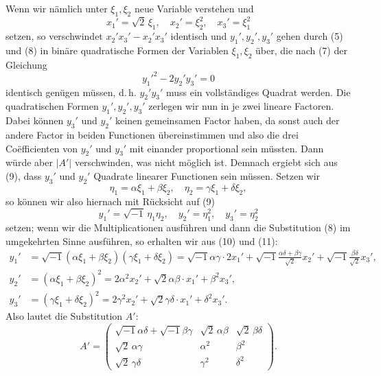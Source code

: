 \documentclass[12pt,a4paper]{article}
\theoremstyle{plain}
\theoremstyle{definition}
\theoremstyle{remark}
\begin{document}
Wenn wir n\"amlich unter $\xi_1, \xi_2$ neue Variable verstehen und
\begin{equation}\label{eq:49_8}
x_1' = \sqrt{2}\,\xi_1,\quad x_2' = \xi_2^2,\quad x_3' = \xi_1^2\tag{8}
\end{equation}
setzen, so verschwindet $x_2'x_3' - x_2'x_3'$ identisch und $y_1', y_2', y_3'$ gehen
durch (5) und (8) in bin\"are quadratische Formen der Variablen
$\xi_1, \xi_2$ \"uber, die nach (7) der Gleichung
\begin{equation}\label{eq:49_9}
y_1'^2 - 2y_2'y_3' = 0\tag{9}
\end{equation}
identisch gen\"ugen m\"ussen, d.\,h. $y_2'y_3'$ muss ein vollst\"andiges
Quadrat werden. Die quadratischen Formen $y_1', y_2', y_3'$ zerlegen
wir nun in je zwei lineare Factoren. Dabei k\"onnen $y_3'$ und $y_2'$
keinen gemeinsamen Factor haben, da sonst auch der andere
Factor in beiden Functionen \"ubereinstimmen und also die drei
Co\"efficienten von $y_2'$ und $y_3'$ mit einander proportional sein
m\"ussten. Dann w\"urde aber $|A'|$ verschwinden, was nicht m\"oglich
ist. Demnach ergiebt sich aus (9), dass $y_3'$ und $y_2'$ Quadrate
linearer Functionen sein m\"ussen. Setzen wir
\begin{equation}\label{eq:49_10}
\eta_1 = \alpha\xi_1 + \beta\xi_2,\quad \eta_2 = \gamma\xi_1 + \delta\xi_2,\tag{10}
\end{equation}
so k\"onnen wir also hiernach mit R\"ucksicht auf (9)
\begin{equation}\label{eq:49_11}
y_1' = \sqrt{-1}\,\eta_1\eta_2,\quad y_2' = \eta_1^2,\quad y_3' = \eta_2^2\tag{11}
\end{equation}
setzen; wenn wir die Multiplicationen ausf\"uhren und dann die
Substitution (8) im umgekehrten Sinne ausf\"uhren, so erhalten wir
aus (10) und (11):
\begin{align*}
y_1' &= \sqrt{-1}(\alpha\xi_1 + \beta\xi_2)(\gamma\xi_1 + \delta\xi_2) = \sqrt{-1}\alpha\gamma\cdot 2x_1' + \sqrt{-1}\frac{\alpha\delta+\beta\gamma}{\sqrt{2}}x_2' + \sqrt{-1}\frac{\beta\delta}{\sqrt{2}}x_3',\\
y_2' &= (\alpha\xi_1 + \beta\xi_2)^2 = 2\alpha^2 x_2' + \sqrt{2}\alpha\beta\cdot x_1' + \beta^2 x_3',\\
y_3' &= (\gamma\xi_1 + \delta\xi_2)^2 = 2\gamma^2 x_2' + \sqrt{2}\gamma\delta\cdot x_1' + \delta^2 x_3'.
\end{align*}
Also lautet die Substitution $A'$:
\begin{equation}\label{eq:49_12}
A' = \begin{pmatrix}
\sqrt{-1}\alpha\delta + \sqrt{-1}\beta\gamma & \sqrt{2}\,\alpha\beta & \sqrt{2}\,\beta\delta\\[4pt]
\sqrt{2}\,\alpha\gamma & \alpha^2 & \beta^2\\[4pt]
\sqrt{2}\,\gamma\delta & \gamma^2 & \delta^2
\end{pmatrix}.\tag{12}
\end{equation}
\end{document}
